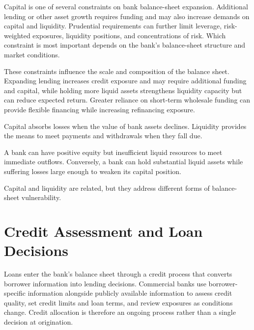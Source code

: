 Capital is one of several constraints on bank balance-sheet expansion. Additional lending or other asset growth requires funding and may also increase demands on capital and liquidity. Prudential requirements can further limit leverage, risk-weighted exposures, liquidity positions, and concentrations of risk. Which constraint is most important depends on the bank's balance-sheet structure and market conditions.

These constraints influence the scale and composition of the balance sheet. Expanding lending increases credit exposure and may require additional funding and capital, while holding more liquid assets strengthens liquidity capacity but can reduce expected return. Greater reliance on short-term wholesale funding can provide flexible financing while increasing refinancing exposure.

\begin{tcolorbox}[
  enhanced,
  breakable,
  colback=white,
  colframe=FinanceBlue,
  boxrule=0.7pt,
  sharp corners,
  borderline west={2.2pt}{0pt}{FinanceBlue},
  title=\textbf{Financial Perspective: Capital and Liquidity Serve Different Functions},
  coltitle=white,
  colbacktitle=FinanceBlue,
  fonttitle=\bfseries,
  before skip=1.2em,
  after skip=1.2em
]

Capital absorbs losses when the value of bank assets declines. Liquidity provides the means to meet payments and withdrawals when they fall due.

A bank can have positive equity but insufficient liquid resources to meet immediate outflows. Conversely, a bank can hold substantial liquid assets while suffering losses large enough to weaken its capital position.

Capital and liquidity are related, but they address different forms of balance-sheet vulnerability.

\end{tcolorbox}



\section{Credit Assessment and Loan Decisions}

Loans enter the bank's balance sheet through a credit process that converts borrower information into lending decisions. Commercial banks use borrower-specific information alongside publicly available information to assess credit quality, set credit limits and loan terms, and review exposures as conditions change. Credit allocation is therefore an ongoing process rather than a single decision at origination.

